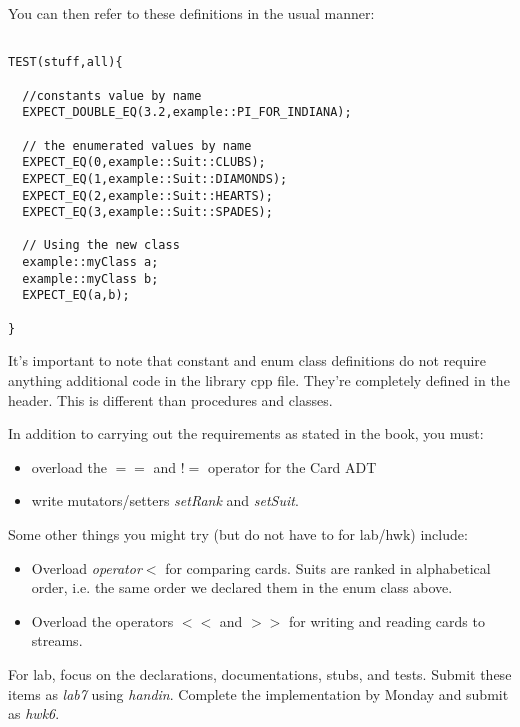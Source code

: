 \documentclass[10pt]{article}
\begin{document}
You can then refer to these definitions in the usual manner:
\begin{verbatim}

TEST(stuff,all){

  //constants value by name
  EXPECT_DOUBLE_EQ(3.2,example::PI_FOR_INDIANA);

  // the enumerated values by name  
  EXPECT_EQ(0,example::Suit::CLUBS);
  EXPECT_EQ(1,example::Suit::DIAMONDS);
  EXPECT_EQ(2,example::Suit::HEARTS);
  EXPECT_EQ(3,example::Suit::SPADES);   

  // Using the new class	
  example::myClass a;
  example::myClass b;
  EXPECT_EQ(a,b);	
  
}
\end{verbatim}
It's important to note that constant and enum class definitions do not require anything additional code in the library cpp file. They're completely defined in the header.  This is different than procedures and classes.

In addition to carrying out the requirements as stated in the book, you must:
\begin{itemize}
\item overload the $==$ and $!=$ operator for the Card ADT
\item write mutators/setters \textit{setRank} and \textit{setSuit}. 
\end{itemize}

Some other things you might try (but do not have to for lab/hwk) include:
\begin{itemize}
\item Overload \textit{operator$<$} for comparing cards. Suits are ranked in alphabetical order, i.e. the same order we declared them in the enum class above.
\item Overload the operators $<<$ and $>>$ for writing and reading cards to streams. 
\end{itemize}

For lab, focus on the declarations, documentations, stubs, and tests. Submit these items as \textit{lab7} using \textit{handin}. Complete the implementation by Monday and submit as \textit{hwk6}.
\end{document}
